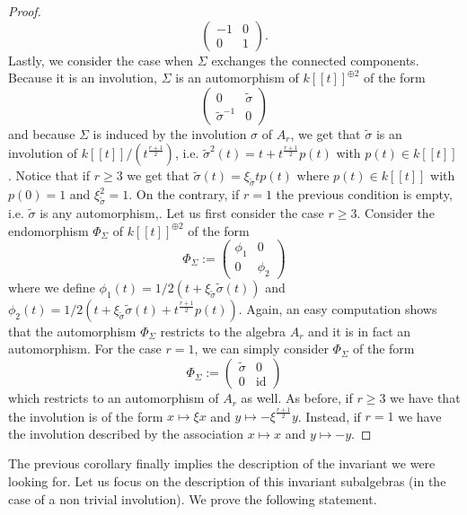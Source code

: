 \documentclass{alggeom}
\numberwithin{equation}{section}
\numberwithin{subsection}{section}
\theoremstyle{definition}
\theoremstyle{remark}
\newcommand\id{\mathrm{id}}
\begin{document}
\begin{proof}
$$\begin{pmatrix}
-1  &  0 \\
 0 &  1
\end{pmatrix}.
$$
Lastly, we consider the case when $\Sigma$ exchanges the connected components. Because it is an involution, $\Sigma$ is an automorphism of $k[[t]]^{\oplus 2}$ of the form 
$$
\begin{pmatrix}
0  &  \tilde{\sigma} \\
\tilde{\sigma}^{-1}  &    0
\end{pmatrix} 
$$
and because $\Sigma$ is induced by the involution $\sigma$ of $A_r$, we get that $\tilde{\sigma}$ is an involution of $k[[t]]/(t^{\frac{r+1}{2}})$, i.e. $\tilde{\sigma}^2(t)=t+t^{\frac{r+1}{2}}p(t)$ with $p(t)\in k[[t]]$. Notice that if $r\geq 3$ we get that $\tilde{\sigma}(t)=\xi_{\tilde{\sigma}}tp(t)$ where $p(t)\in k[[t]]$ with $p(0)=1$ and $\xi_{\tilde{\sigma}}^2=1$. On the contrary, if $r=1$ the previous condition is empty, i.e. $\tilde{\sigma}$ is any automorphism,. Let us first consider the case $r\geq 3$. Consider the endomorphism $\Phi_{\Sigma}$ of $k[[t]]^{\oplus 2}$ of the form 
$$
\Phi_{\Sigma}:=
\begin{pmatrix}
\phi_1  &  0 \\
0  &    \phi_2
\end{pmatrix} 
$$ 
where we define $\phi_1(t)=1/2(t+\xi_{\tilde{\sigma}}\tilde{\sigma}(t))$ and $\phi_2(t)=1/2(t+\xi_{\tilde{\sigma}}\tilde{\sigma}(t)+t^{\frac{r+1}{2}}p(t))$. Again, an easy computation shows that the automorphism $\Phi_{\Sigma}$ restricts to the algebra $A_r$ and it is in fact an automorphism. For the case $r=1$, we can simply consider $\Phi_{\Sigma}$ of the form 
$$
\Phi_{\Sigma}:=
\begin{pmatrix}
 \tilde{\sigma} &  0 \\
0  &    \id
\end{pmatrix} 
$$
which restricts to an automorphism of $A_r$ as well. As before, if $r\geq 3$ we have that the involution is of the form $x\mapsto \xi x$ and $y \mapsto -\xi^{\frac{r+1}{2}}y$. Instead, if $r=1$ we have the involution described by the association $ x \mapsto x$ and $y \mapsto -y$. 
	
\end{proof}



The previous corollary finally implies the description of the invariant we were looking for. Let us focus on the description of this invariant subalgebras (in the case of a non trivial involution). We prove the following statement.
 
\end{document}

